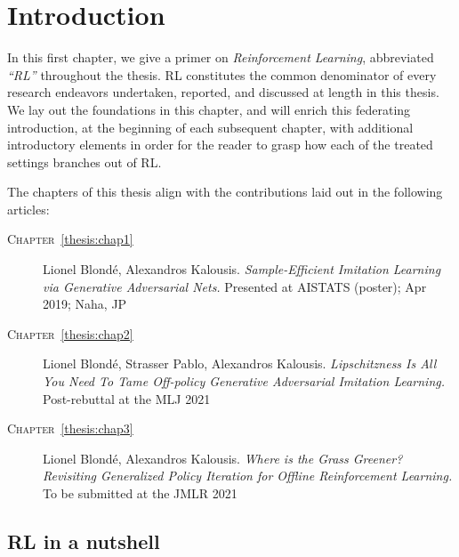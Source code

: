 

\chapter[Introduction]{Introduction}
\label{thesis:intro}

In this first chapter, we give a primer on \emph{Reinforcement Learning},
abbreviated \textit{``RL''} throughout the thesis.
RL constitutes the common denominator of every research endeavors undertaken, reported, and
discussed at length in this thesis.
We lay out the foundations in this chapter, and will enrich this federating introduction,
at the beginning of each subsequent chapter, with additional introductory elements
in order for the reader to grasp how each of the treated settings branches out of RL.

The chapters of this thesis align with the contributions laid out in the following articles:
\begin{description}
\item[\textsc{Chapter}~\ref{thesis:chap1}]
Lionel Blondé, Alexandros Kalousis.
\textit{Sample-Efficient Imitation Learning via Generative Adversarial Nets.}
Presented at AISTATS (poster); Apr 2019; Naha, JP
\item[\textsc{Chapter}~\ref{thesis:chap2}]
Lionel Blondé, Strasser Pablo, Alexandros Kalousis.
\textit{Lipschitzness Is All You Need To Tame Off-policy Generative Adversarial Imitation Learning.}
Post-rebuttal at the MLJ 2021
\item[\textsc{Chapter}~\ref{thesis:chap3}]
Lionel Blondé, Alexandros Kalousis.
\textit{Where is the Grass Greener? Revisiting Generalized Policy Iteration for Offline Reinforcement Learning.}
To be submitted at the JMLR 2021
\end{description}

\section{RL in a nutshell}

